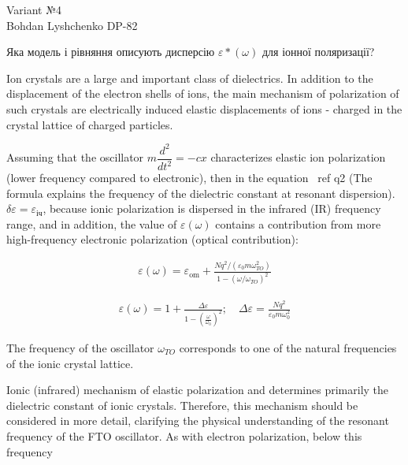 \documentclass[a4paper,14pt]{extreport}
\begin{document}
\pagecolor{white}


\begin{center}
Variant №4\\
\vspace{0.5cm}
Bohdan Lyshchenko DP-82
\end{center}

\begin{center}
Яка модель і рівняння описують дисперсію $\varepsilon*(\omega)$ для іонної поляризації?
\end{center}
\vspace{1cm}





Ion crystals are a large and important class of dielectrics. In addition to the displacement of the electron shells of ions, the main mechanism of polarization of such crystals are electrically induced elastic displacements of ions - charged in the crystal lattice of charged particles.

Assuming that the oscillator $ m \dfrac {d^2} {dt^2} = -cx $ characterizes elastic ion polarization (lower frequency compared to
 electronic), then in the equation \ ref {q2} (The formula explains the frequency of the dielectric constant at resonant dispersion). $ \delta
  \varepsilon = \varepsilon_{\text{іч}} $, because ionic polarization is dispersed in the infrared (IR) frequency range, and in addition, the value of $ \varepsilon (\omega) $ contains a contribution from more
   high-frequency electronic polarization (optical contribution):

\begin{align}
  \varepsilon(\omega)=\varepsilon_{\mathrm{om}}+\frac{N q^{2} /\left(\varepsilon_{0} m \omega_{T O}^{2}\right)}{1-\left(\omega / \omega_{T O}\right)^{2}}
\label{q1}
\end{align}

\begin{align}
\varepsilon(\omega)=1+\frac{\Delta \varepsilon}{1-\left(\frac{\omega}{\omega_{0}}\right)^{2}} ; \quad \Delta \varepsilon=\frac{N q^{2}}{\varepsilon_{0} m \omega_{0}^{2}}
\label{q2}
\end{align}

The frequency of the oscillator $ \omega_{TO} $ corresponds to one of the natural frequencies of the ionic crystal lattice.

Ionic (infrared) mechanism of elastic polarization and determines primarily the dielectric constant of ionic crystals. Therefore, this mechanism should be considered in more detail, clarifying the physical understanding of the resonant frequency of the FTO oscillator. As with electron polarization, below this frequency
\end{document}
